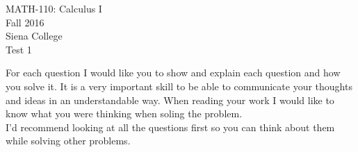 \documentclass[11pt]{article}
\begin{document}
	\begin{center}
		MATH-110: Calculus I\\
		Fall 2016\\
		Siena College\\
		\vspace{.1in}
		Test 1
	\end{center}
	\vspace{.1in}
	
	For each question I would like you to show and explain each question and how you solve it.  It is a very important skill to be able to communicate your thoughts and ideas in an understandable way. When reading your work I would like to know what you were thinking when soling the problem.\\
	
	I'd recommend looking at all the questions first so you can think about them while solving other problems.\\
	
\end{document}
